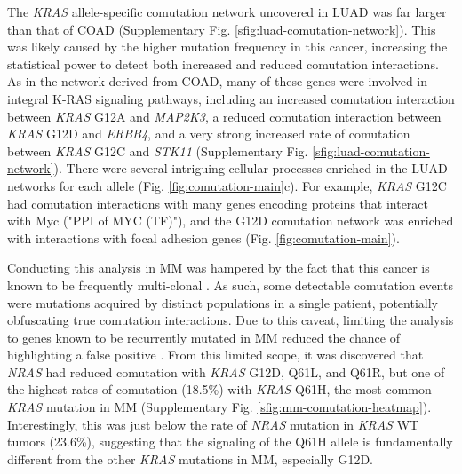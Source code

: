 \documentclass[english, 10pt, letterpaper]{article}
\newcommand{\KRAS}{\emph{KRAS}}
\newcommand{\kras}{K-RAS}
\begin{document}
The \KRAS{} allele-specific comutation network uncovered in LUAD was far larger than that of COAD (Supplementary Fig. \ref{sfig:luad-comutation-network}).
This was likely caused by the higher mutation frequency in this cancer, increasing the statistical power to detect both increased and reduced comutation interactions.
As in the network derived from COAD, many of these genes were involved in integral \kras{} signaling pathways, including an increased comutation interaction between \KRAS{} G12A and \emph{MAP2K3}, a reduced comutation interaction between \KRAS{} G12D and \emph{ERBB4}, and a very strong increased rate of comutation between \KRAS{} G12C and \emph{STK11} (Supplementary Fig. \ref{sfig:luad-comutation-network}).
There were several intriguing cellular processes enriched in the LUAD networks for each allele (Fig. \ref{fig:comutation-main}c).
For example, \KRAS{} G12C had comutation interactions with many genes encoding proteins that interact with Myc ("PPI of MYC (TF)"), and the G12D comutation network was enriched with interactions with focal adhesion genes (Fig. \ref{fig:comutation-main}).

Conducting this analysis in MM was hampered by the fact that this cancer is known to be frequently multi-clonal \cite{Sondka2018, Lohr2014WidespreadTherapy.}.
As such, some detectable comutation events were mutations acquired by distinct populations in a single patient, potentially obfuscating true comutation interactions.
Due to this caveat, limiting the analysis to genes known to be recurrently mutated in MM reduced the chance of highlighting a false positive \cite{Lohr2014WidespreadTherapy.}.
From this limited scope, it was discovered that \emph{NRAS} had reduced comutation with \KRAS{} G12D, Q61L, and Q61R, but one of the highest rates of comutation (18.5\%) with \KRAS{} Q61H, the most common \KRAS{} mutation in MM (Supplementary Fig. \ref{sfig:mm-comutation-heatmap}).
Interestingly, this was just below the rate of \emph{NRAS} mutation in \KRAS{} WT tumors (23.6\%), suggesting that the signaling of the Q61H allele is fundamentally different from the other \KRAS{} mutations in MM, especially G12D.
\end{document}
